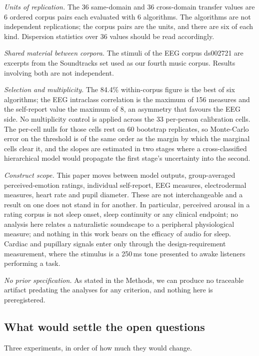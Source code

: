 \emph{Units of replication.} The 36 same-domain and 36 cross-domain transfer
values are 6 ordered corpus pairs each evaluated with 6 algorithms. The
algorithms are not independent replications; the corpus pairs are the units,
and there are six of each kind. Dispersion statistics over 36 values should be
read accordingly.

\emph{Shared material between corpora.} The stimuli of the EEG corpus
ds002721 are excerpts from the Soundtracks set used as our fourth music
corpus. Results involving both are not independent.

\emph{Selection and multiplicity.} The 84.4\% within-corpus figure is the best
of six algorithms; the EEG intraclass correlation is the maximum of 156
measures and the self-report value the maximum of 8, an asymmetry that
favours the EEG side. No multiplicity control is applied across the 33
per-person calibration cells. The per-cell nulls for those cells rest on 60
bootstrap replicates, so Monte-Carlo error on the threshold is of the same
order as the margin by which the marginal cells clear it, and the slopes are
estimated in two stages where a cross-classified hierarchical model would
propagate the first stage's uncertainty into the second.

\emph{Construct scope.} This paper moves between model outputs,
group-averaged perceived-emotion ratings, individual self-report, EEG
measures, electrodermal measures, heart rate and pupil diameter. These are not
interchangeable and a result on one does not stand in for another. In
particular, perceived arousal in a rating corpus is not sleep onset, sleep
continuity or any clinical endpoint; no analysis here relates a naturalistic
soundscape to a peripheral physiological measure; and nothing in this work
bears on the efficacy of audio for sleep. Cardiac and pupillary signals enter
only through the design-requirement measurement, where the stimulus is a
250\,ms tone presented to awake listeners performing a task.

\emph{No prior specification.} As stated in the Methods, we can produce no
traceable artifact predating the analyses for any criterion, and nothing here
is preregistered.

\subsection{What would settle the open questions}

Three experiments, in order of how much they would change.

